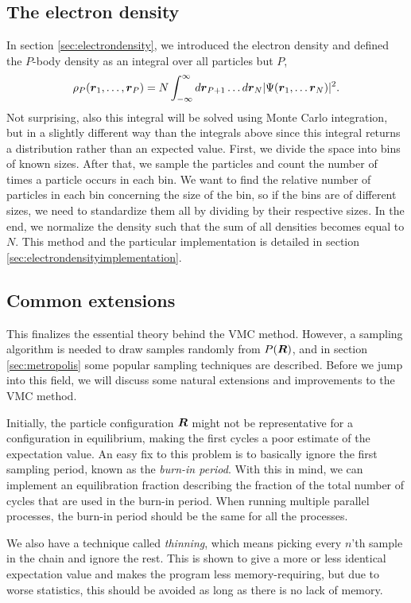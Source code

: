 \subsection{The electron density} \label{sec:electrondensityqmc}
In section \ref{sec:electrondensity}, we introduced the electron density and defined the $P$-body density as an integral over all particles but $P$,
\begin{equation}
\rho_P(\boldsymbol{{r}}_1,\hdots,\boldsymbol{{r}}_P)=N\int_{-\infty}^{\infty}d\boldsymbol{{r}}_{P+1}\hdots d\boldsymbol{{r}}_N |\Psi(\boldsymbol{{r}}_1,\hdots \boldsymbol{{r}}_N)|^2.
\end{equation}
Not surprising, also this integral will be solved using Monte Carlo integration, but in a slightly different way than the integrals above since this integral returns a distribution rather than an expected value. First, we divide the space into bins of known sizes. After that, we sample the particles and count the number of times a particle occurs in each bin. We want to find the relative number of particles in each bin concerning the size of the bin, so if the bins are of different sizes, we need to standardize them all by dividing by their respective sizes. In the end, we normalize the density such that the sum of all densities becomes equal to $N$. This method and the particular implementation is detailed in section \ref{sec:electrondensityimplementation}.

\subsection{Common extensions}
This finalizes the essential theory behind the VMC method. However, a sampling algorithm is needed to draw samples randomly from $P(\boldsymbol{{R}})$, and in section \ref{sec:metropolis} some popular sampling techniques are described. Before we jump into this field, we will discuss some natural extensions and improvements to the VMC method.

Initially, the particle configuration $\boldsymbol{{R}}$ might not be representative for a configuration in equilibrium, making the first cycles a poor estimate of the expectation value. An easy fix to this problem is to basically ignore the first sampling period, known as the \textit{burn-in period}. With this in mind, we can implement an equilibration fraction describing the fraction of the total number of cycles that are used in the burn-in period. When running multiple parallel processes, the burn-in period should be the same for all the processes.

We also have a technique called \textit{thinning}, which means picking every $n$'th sample in the chain and ignore the rest. This is shown to give a more or less identical expectation value and makes the program less memory-requiring, but due to worse statistics, this should be avoided as long as there is no lack of memory. 

